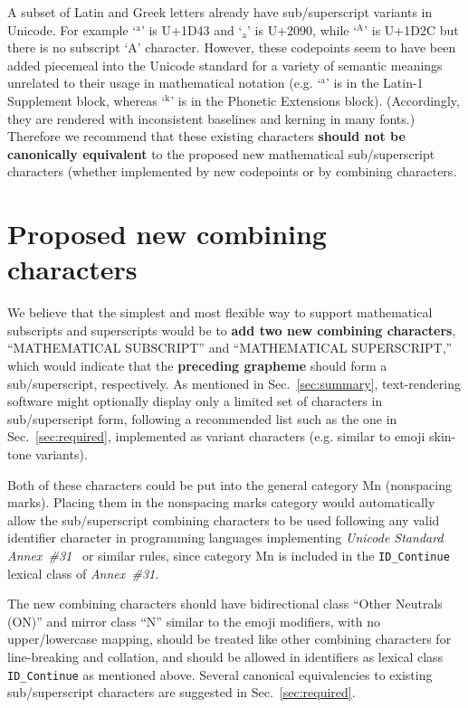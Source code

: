 \documentclass[10pt,english]{article}
\newcommand{\secref}[1]{Sec.~\ref{sec:#1}}
\begin{document}
A subset of Latin and Greek letters already have sub/superscript variants in Unicode.  For example `$^\mathrm{a}$' is U+1D43 and `$_\mathrm{a}$' is U+2090, while `$^\mathrm{A}$' is U+1D2C but there is no subscript `A' character.   However, these codepoints seem to have been added piecemeal into the Unicode standard for a variety of semantic meanings unrelated to their usage in mathematical notation (e.g. `$^\mathrm{a}$' is in the Latin-1 Supplement block, whereas `$^\mathrm{k}$' is in the Phonetic Extensions block).   (Accordingly, they are rendered with inconsistent baselines and kerning in many fonts.) Therefore we recommend that these existing characters \textbf{should not be canonically equivalent} to the proposed new mathematical sub/superscript characters (whether implemented by new codepoints or by combining characters.

\section{Proposed new combining characters}

We believe that the simplest and most flexible way to support mathematical subscripts and superscripts would be to \textbf{add two new combining characters}, ``MATHEMATICAL SUBSCRIPT'' and ``MATHEMATICAL SUPERSCRIPT,'' which would indicate that the \textbf{preceding grapheme} should form a sub/superscript, respectively.   As mentioned in \secref{summary}, text-rendering software might optionally display only a limited set of characters in sub/superscript form, following a recommended list such as the one in \secref{required}, implemented as variant characters (e.g. similar to emoji skin-tone variants).

Both of these characters could be put into the general category Mn (nonspacing marks). Placing them in the nonspacing marks category would automatically allow the sub/superscript combining characters to be used following any valid identifier character in programming languages implementing \emph{Unicode Standard Annex~\#31}~\cite{UAX31} or similar rules, since category Mn is included in the \texttt{ID\_Continue} lexical class of \emph{Annex~\#31}.

The new combining characters should have bidirectional class ``Other Neutrals (ON)'' and mirror class ``N'' similar to the emoji modifiers, with no upper/lowercase mapping, should be treated like other combining characters for line-breaking and collation, and should be allowed in identifiers as lexical class \texttt{ID\_Continue} as mentioned above.   Several  canonical equivalencies to existing sub/superscript characters are suggested in \secref{required}.
\end{document}
